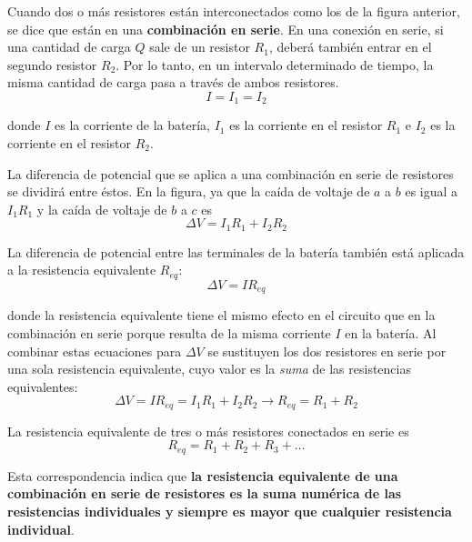       \PN Cuando dos o más resistores están interconectados como los de la figura anterior, se dice que están en una
      \textbf{combinación en serie}. En una conexión en serie, si una cantidad de carga $Q$ sale de un resistor $R_{1}$,
      deberá también entrar en el segundo resistor $R_{2}$. Por lo tanto, en un intervalo determinado de tiempo, la
      misma cantidad de carga pasa a través de ambos resistores.
      \begin{equation*}
        I = I_{1} = I_{2}
      \end{equation*}

      \PN donde $I$ es la corriente de la batería, $I_{1}$ es la corriente en el resistor $R_{1}$ e $I_{2}$ es la
      corriente en el resistor $R_{2}$.

      \VS
      \PN La diferencia de potencial que se aplica a una combinación en serie de resistores se dividirá entre éstos. En
      la figura, ya que la caída de voltaje de $a$ a $b$ es igual a $I_{1}R_{1}$ y la caída de voltaje de $b$ a $c$ es
      \begin{equation*}
        \Delta V = I_{1}R_{1} + I_{2}R_{2}
      \end{equation*}

      \PN La diferencia de potencial entre las terminales de la batería también está aplicada a la resistencia
      equivalente $R_{eq}$:
      \begin{equation*}
        \Delta V = I R_{eq}
      \end{equation*}

      \PN donde la resistencia equivalente tiene el mismo efecto en el circuito que en la combinación en serie porque
      resulta de la misma corriente $I$ en la batería. Al combinar estas ecuaciones para $\Delta V$ se sustituyen los
      dos resistores en serie por una sola resistencia equivalente, cuyo valor es la \textit{suma} de las resistencias
      equivalentes:
      \begin{equation*}
        \Delta V = I R_{eq} = I_{1}R_{1} + I_{2}R_{2} \rightarrow R_{eq} = R_{1} + R_{2}
      \end{equation*}

      \PN La resistencia equivalente de tres o más resistores conectados en serie es
      \begin{equation*}
        R_{eq} = R_{1} + R_{2} + R_{3} + \dotsc
      \end{equation*}

      \PN Esta correspondencia indica que \textbf{la resistencia equivalente de una combinación en serie de resistores
      es la suma numérica de las resistencias individuales y siempre es mayor que cualquier resistencia individual}.

